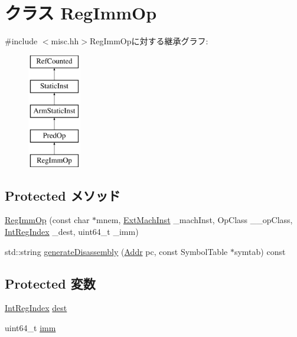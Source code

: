 \hypertarget{classRegImmOp}{
\section{クラス RegImmOp}
\label{classRegImmOp}
}


{\ttfamily \#include $<$misc.hh$>$}RegImmOpに対する継承グラフ:\begin{figure}[H]
\begin{center}
\leavevmode
\includegraphics[height=5cm]{classRegImmOp}
\end{center}
\end{figure}
\subsection*{Protected メソッド}
\begin{DoxyCompactItemize}
\item 
\hyperlink{classRegImmOp_a6670b35e53e6a4257fd6c0ebd586ab5e}{RegImmOp} (const char $\ast$mnem, \hyperlink{classStaticInst_a5605d4fc727eae9e595325c90c0ec108}{ExtMachInst} \_\-machInst, OpClass \_\-\_\-opClass, \hyperlink{namespaceArmISA_ae64680ba9fb526106829d6bf92fc791b}{IntRegIndex} \_\-dest, uint64\_\-t \_\-imm)
\item 
std::string \hyperlink{classRegImmOp_a95d323a22a5f07e14d6b4c9385a91896}{generateDisassembly} (\hyperlink{classm5_1_1params_1_1Addr}{Addr} pc, const SymbolTable $\ast$symtab) const 
\end{DoxyCompactItemize}
\subsection*{Protected 変数}
\begin{DoxyCompactItemize}
\item 
\hyperlink{namespaceArmISA_ae64680ba9fb526106829d6bf92fc791b}{IntRegIndex} \hyperlink{classRegImmOp_aec72e8e45bdc87abeeeb75d2a8a9a716}{dest}
\item 
uint64\_\-t \hyperlink{classRegImmOp_a2b4406ad2843b5aa12d244d01d8fdc69}{imm}
\end{DoxyCompactItemize}


